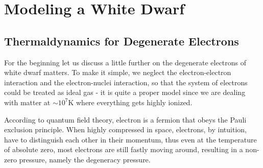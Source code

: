 \documentclass[a4paper,11pt]{article}
\numberwithin{equation}{section}
\numberwithin{table}{section}
\numberwithin{figure}{section}
\begin{document}
		
		
	\section{Modeling a White Dwarf}
	
		\subsection{Thermaldynamics for Degenerate Electrons}
			\label{sct:intro-electron}
			
			For the beginning let us discuss a little further on the degenerate electrons of white dwarf matters. To make it simple, we neglect the electron-electron interaction and the electron-nuclei interaction, so that the system of electrons could be treated as ideal gas - it is quite a proper model since we are dealing with matter at $\sim10^7\mathrm{K}$ where everything gets highly ionized. 
			
			According to quantum field theory, electron is a fermion that obeys the Pauli exclusion principle. When highly compressed in space, electrons, by intuition, have to distinguish each other in their momentum, thus even at the temperature of absolute zero, most electrons are still fastly moving around, resulting in a non-zero pressure, namely the degeneracy pressure.
			
\end{document}
